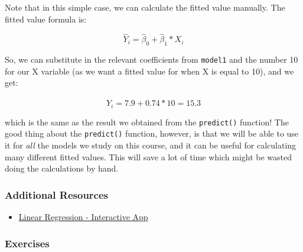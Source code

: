 \documentclass[]{article}
\providecommand{\tightlist}{%
  \setlength{\itemsep}{0pt}\setlength{\parskip}{0pt}}
\theoremstyle{definition}
\theoremstyle{definition}
\theoremstyle{definition}
\theoremstyle{remark}
\begin{document}
Note that in this simple case, we can calculate the fitted value
manually. The fitted value formula is:

\[\hat{Y}_{i} = \hat{\beta}_0 + \hat{\beta}_1 * X_i\]

So, we can substitute in the relevant coefficients from \texttt{model1}
and the number 10 for our X variable (as we want a fitted value for when
X is equal to 10), and we get:

\[\hat{Y}_{i} = 7.9 + 0.74 * 10 = 15.3\]

which is the same as the result we obtained from the \texttt{predict()}
function! The good thing about the \texttt{predict()} function, however,
is that we will be able to use it for \emph{all} the models we study on
this course, and it can be useful for calculating many different fitted
values. This will save a lot of time which might be wasted doing the
calculations by hand.

\subsubsection{Additional Resources}\label{additional-resources}

\begin{itemize}
\tightlist
\item
  \href{http://altaf.shinyapps.io/linear-regression}{Linear Regression -
  Interactive App}
\end{itemize}

\subsubsection{Exercises}\label{exercises-5}
\end{document}
